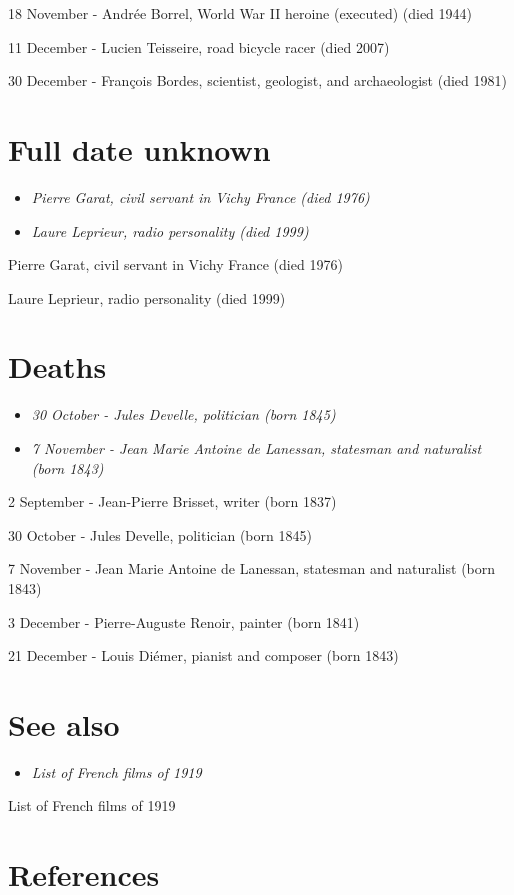 18 November - Andrée Borrel, World War II heroine (executed) (died 1944)

11 December - Lucien Teisseire, road bicycle racer (died 2007)

30 December - François Bordes, scientist, geologist, and archaeologist
(died 1981)

\section{Full date unknown}\label{full-date-unknown}

\begin{itemize}
\item
  \emph{Pierre Garat, civil servant in Vichy France (died 1976)}
\item
  \emph{Laure Leprieur, radio personality (died 1999)}
\end{itemize}

Pierre Garat, civil servant in Vichy France (died 1976)

Laure Leprieur, radio personality (died 1999)

\section{Deaths}\label{deaths}

\begin{itemize}
\item
  \emph{30 October - Jules Develle, politician (born 1845)}
\item
  \emph{7 November - Jean Marie Antoine de Lanessan, statesman and
  naturalist (born 1843)}
\end{itemize}

2 September - Jean-Pierre Brisset, writer (born 1837)

30 October - Jules Develle, politician (born 1845)

7 November - Jean Marie Antoine de Lanessan, statesman and naturalist
(born 1843)

3 December - Pierre-Auguste Renoir, painter (born 1841)

21 December - Louis Diémer, pianist and composer (born 1843)

\section{See also}\label{see-also}

\begin{itemize}
\item
  \emph{List of French films of 1919}
\end{itemize}

List of French films of 1919

\section{References}\label{references}
